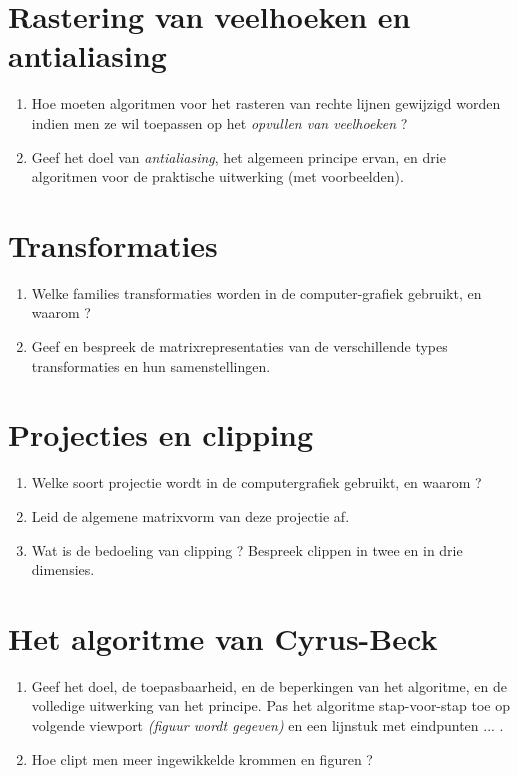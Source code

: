 \documentclass{report}
\begin{document}
	\section{Rastering van veelhoeken en antialiasing}
	\begin{enumerate}
		\item Hoe moeten algoritmen voor het rasteren van rechte lijnen gewijzigd worden indien men ze wil toepassen op het \textit{opvullen van veelhoeken} ? 
		
		\item Geef het doel van \textit{antialiasing}, het algemeen principe ervan, en drie algoritmen voor de praktische uitwerking (met voorbeelden). 
	\end{enumerate}

	\section{Transformaties}
	\begin{enumerate}
	\item Welke families transformaties worden in de computer-grafiek gebruikt, en waarom ?
	
	\item Geef en bespreek de matrixrepresentaties van de verschillende types transformaties en hun samenstellingen. 
	\end{enumerate}

	\section{Projecties en clipping}

	\begin{enumerate}
	\item Welke soort projectie wordt in de computergrafiek gebruikt, en waarom ?
	
	\item Leid de algemene matrixvorm van deze projectie af. 
	
	\item Wat is de bedoeling van clipping ? Bespreek clippen in twee en in drie dimensies. 
	\end{enumerate}

	\section{Het algoritme van Cyrus-Beck}
	\begin{enumerate}
		\item Geef het doel, de toepasbaarheid, en de beperkingen van het algoritme, en de volledige uitwerking van het principe. Pas het algoritme stap-voor-stap toe op volgende viewport \textit{(figuur wordt gegeven)} en een lijnstuk met eindpunten ... .  
		
		\item Hoe clipt men meer ingewikkelde krommen en figuren ?
	\end{enumerate}
\end{document}
